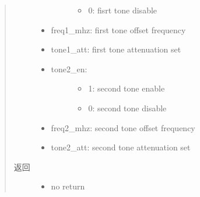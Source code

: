\documentclass[letterpaper,10pt,english]{sphinxhowto}
\begin{document}
\begin{fulllineitems}
\begin{fulllineitems}
\begin{quote}
\begin{description}
\begin{itemize}
\begin{description}
\begin{itemize}
\item {} 
0: fisrt tone disable

\end{itemize}

\end{description}

\item {} 
freq1\_mhz: first tone offset frequency

\item {} 
tone1\_att: first tone attenuation set

\item {} \begin{description}
\item[{tone2\_en:}] \leavevmode\begin{itemize}
\item {} 
1: second tone enable

\item {} 
0: second tone disable

\end{itemize}

\end{description}

\item {} 
freq2\_mhz: second tone offset frequency

\item {} 
tone2\_att: second tone attenuation set

\end{itemize}

\item[{返回}] \leavevmode
\begin{itemize}
\item {} 
no return

\end{itemize}


\end{description}\end{quote}

\end{fulllineitems}


\begin{fulllineitems}
\label{\detokenize{rfapi/index:wifi_api.WIFIAPI.txtone_step}}
\end{fulllineitems}


\end{fulllineitems}
\end{document}
